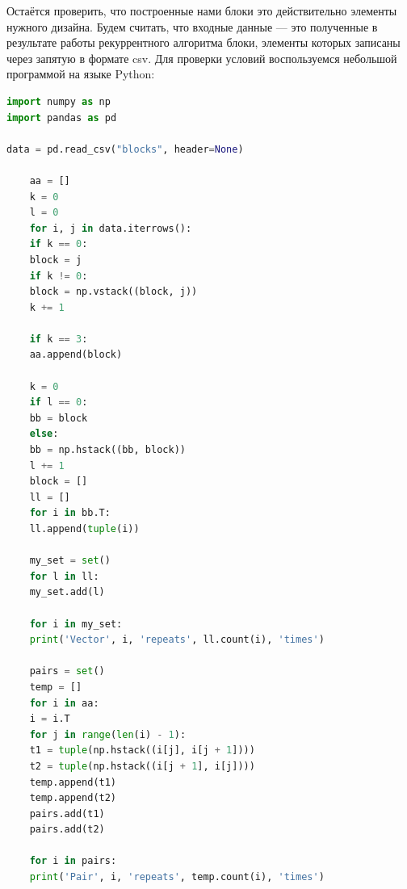 \documentclass[12pt]{article}
\begin{document}
    Остаётся проверить, что построенные нами блоки это действительно элементы нужного дизайна.
    Будем считать, что входные данные — это полученные в результате работы рекуррентного алгоритма блоки,
    элементы которых записаны через запятую в формате csv.
    Для проверки условий воспользуемся небольшой программой на языке Python:
    \begin{lstlisting}[language=Python]
import numpy as np
import pandas as pd

data = pd.read_csv("blocks", header=None)

    aa = []
    k = 0
    l = 0
    for i, j in data.iterrows():
    if k == 0:
    block = j
    if k != 0:
    block = np.vstack((block, j))
    k += 1

    if k == 3:
    aa.append(block)

    k = 0
    if l == 0:
    bb = block
    else:
    bb = np.hstack((bb, block))
    l += 1
    block = []
    ll = []
    for i in bb.T:
    ll.append(tuple(i))

    my_set = set()
    for l in ll:
    my_set.add(l)

    for i in my_set:
    print('Vector', i, 'repeats', ll.count(i), 'times')

    pairs = set()
    temp = []
    for i in aa:
    i = i.T
    for j in range(len(i) - 1):
    t1 = tuple(np.hstack((i[j], i[j + 1])))
    t2 = tuple(np.hstack((i[j + 1], i[j])))
    temp.append(t1)
    temp.append(t2)
    pairs.add(t1)
    pairs.add(t2)

    for i in pairs:
    print('Pair', i, 'repeats', temp.count(i), 'times')
    \end{lstlisting}\leavevmode \\\\\\\\\\\\
\end{document}
